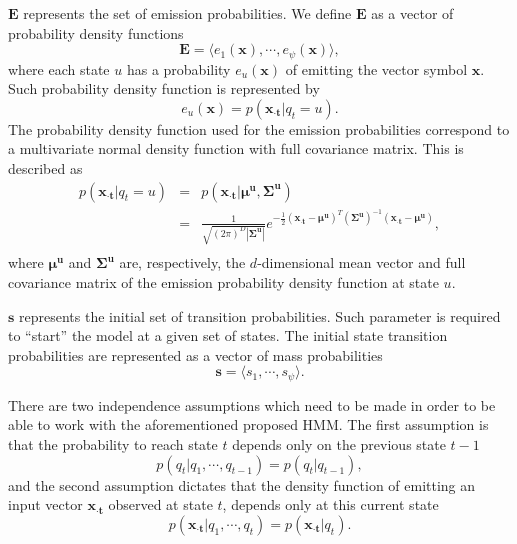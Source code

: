 $\mathbf{E}$ represents the set of emission probabilities. We define $\mathbf{E}$ as a vector of probability density functions
\begin{equation}
  \label{eq:hmm.e}
  \mathbf{E} = \langle e_1(\mathbf{x}), \cdots, e_{\psi}(\mathbf{x}) \rangle,
\end{equation}
where each state $u$ has a probability $e_u(\mathbf{x})$ of emitting the vector symbol $ \mathbf{x} $. Such probability density function is represented by
\begin{equation}
  \label{eq:hmm.emission}
  e_u(\mathbf{x}) = p( \mathbf{{x}_{\cdot t}} | q_t = u).
\end{equation}
The probability density function used for the emission probabilities correspond to a multivariate normal density function with full covariance matrix. This is described as
\begin{equation}
  \label{eq:hmm.emission.gaussian}
  \begin{array}{lcl}
    p(\mathbf{{x}_{\cdot t}} | q_t = u) & = & 
    p(\mathbf{x_{\cdot t}}|{{\boldsymbol\mu}^{\mathbf{u}}},{{\boldsymbol\Sigma}^{\mathbf{u}}})\\[0.4em] & = &
    \frac{1}{ \sqrt{(2\pi)^{D} {| {{\boldsymbol\Sigma}^{\mathbf{u}}} |}}}
    e^{-\frac{1}{2} (\mathbf{x_{\cdot t}}-{{\boldsymbol\mu}^{\mathbf{u}}})^T ({{\boldsymbol\Sigma}^{\mathbf{u}}})^{-1} (\mathbf{x_{\cdot t}}-{{\boldsymbol\mu}^{\mathbf{u}}})}, \\
  \end{array}
\end{equation}
where ${{\boldsymbol\mu}^{\mathbf{u}}}$ and ${{\boldsymbol\Sigma}^{\mathbf{u}}}$ are, respectively, the $d$-dimensional mean vector and full covariance matrix of the emission probability density function at state $u$.

$\mathbf{s}$ represents the initial set of transition probabilities. Such parameter is required to ``start'' the model at a given set of states. The initial state transition probabilities are represented as a vector of mass probabilities
\begin{equation}
  \label{eq:hmm.initial}
  \mathbf{s} = \langle s_{1}, \cdots, s_{\psi} \rangle.
\end{equation}

There are two independence assumptions which need to be made in order to be able to work with the aforementioned proposed HMM. The first assumption is that the probability to reach state $t$ depends only on the previous state $t-1$
\begin{equation}
  \label{eq:hmm.indep.1}
  p(q_t | q_1, \cdots, q_{t-1}) = p(q_t | q_{t-1}),
\end{equation}
and the second assumption dictates that the density function of emitting an input vector $\mathbf{{x}_{\cdot t}}$ observed at state $t$, depends only at this current state
\begin{equation}
  \label{eq:hmm.indep.2}
  p(\mathbf{{x}_{\cdot t}} | q_1, \cdots, q_t) = p(\mathbf{{x}_{\cdot t}} | q_t).
\end{equation}

